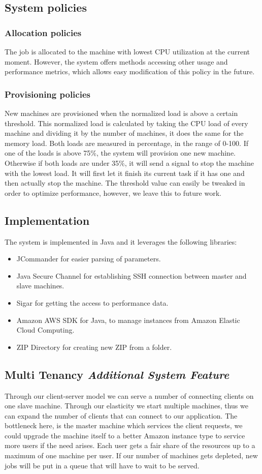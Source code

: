 \subsection{System policies}
\subsubsection{Allocation policies}
The job is allocated to the machine with lowest CPU utilization at the current moment. However, the system offers methods accessing other usage and performance metrics, which allows easy modification of this policy in the future.
\subsubsection{Provisioning policies}
New machines are provisioned when the normalized load is above a certain threshold. This normalized load is calculated by taking the CPU load of every machine and dividing it by the number of machines, it does the same for the memory load. Both loads are measured in percentage, in the range of 0-100. If one of the loads is above 75\%, the system will provision one new machine. Otherwise if both loads are under 35\%, it will send a signal to stop the machine with the lowest load. It will first let it finish its current task if it has one and then actually stop the machine. The threshold value can easily be tweaked in order to optimize performance, however, we leave this to future work.
\subsection{Implementation}
The system is implemented in Java and it leverages the following libraries:
\begin{itemize}
 \item JCommander\cite{jcommander} for easier parsing of parameters.
 \item Java Secure Channel\cite{jsch} for establishing SSH connection between master and slave machines.
 \item Sigar\cite{sigar} for getting the access to performance data.
 \item Amazon AWS SDK for Java\cite{aws}, to manage instances from Amazon Elastic Cloud Computing.
 \item ZIP Directory\cite{zip} for creating new ZIP from a folder.
\end{itemize}

\subsection{Multi Tenancy \emph{Additional System Feature}}
Through our client-server model we can serve a number of connecting clients on one slave machine. Through our elasticity we start multiple machines, thus we can expand the number of clients that can connect to our application. The bottleneck here, is the master machine which services the client requests, we could upgrade the machine itself to a better Amazon instance type to service more users if the need arises. 
Each user gets a fair share of the resources up to a maximum of one machine per user. If our number of machines gets depleted, new jobs will be put in a queue that will have to wait to be served. 
